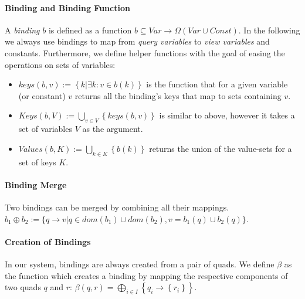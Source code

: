 \documentclass[a4paper,twoside,bibtotoc,abstracton,12pt,BCOR=15mm]{scrreprt}
\begin{document}
\paragraph{Binding and Binding Function}
A \emph{binding} $b$ is defined as a function $b \subseteq Var \rightarrow \Omega{ \left ( Var \cup Const \right ) }$.
In the following we always use bindings to map from \emph{query variables} to \emph{view variables} and constants.
Furthermore, we define helper functions with the goal of easing the operations on sets of variables:
\begin{itemize}
\item $\mathit{keys}(b, v) := \left\{ k | \exists k: v \in b(k) \right\}$ is the function that for a given variable (or constant) $v$ returns all the binding's keys that map to sets containing $v$.
\item $\mathit{Keys}(b, V) := \bigcup_{v \in V} \left \{ keys(b, v) \right \}$ is similar to above, however it takes a set of variables $V$ as the argument.
\item $\mathit{Values}(b, K) := \bigcup_{k \in K} \left \{ b(k) \right \}$ returns the union of the value-sets for a set of keys $K$.
\end{itemize}


\paragraph{Binding Merge}
Two bindings can be merged by combining all their mappings. $b_1 \oplus b_2 := \{q \rightarrow v | q \in {dom(b_1) \cup dom(b_2)}, v = b_1(q) \cup b_2(q)\}$.

\paragraph{Creation of Bindings}
In our system, bindings are always created from a pair of quads. We define $\beta$ as the function which creates a binding
by mapping the respective components of two quads $q$ and $r$:
 $\beta(q, r) = \bigoplus_{i \in I} \left \{q_i \rightarrow \left \{r_i \right \} \right \}$.
\end{document}
